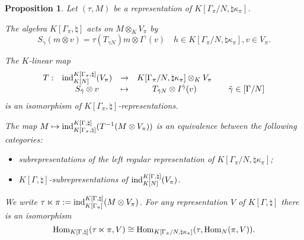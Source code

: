\documentclass[11pt]{amsart}
\newtheorem{prop}[thm]{Proposition}
\theoremstyle{definition}
\newcommand{\enuma}[1]{\begin{enumerate}[\textup{(}a\textup{)}] {#1} \end{enumerate}}
\def\Hom{{\rm Hom}}
\def\ind{{\rm ind}}
\begin{document}
\begin{prop}\label{prop:1.1}
Let $(\tau,M)$ be a representation of $K[\Gamma_\pi / N,\natural \kappa_\pi]$.
\enuma{
\item The algebra $K[\Gamma_\pi,\natural]$ acts on $M \otimes_K V_\pi$ by
\[
S_\gamma (m \otimes v) = \tau (T_{\gamma N}) m \otimes I^\gamma (v) 
\quad h \in K[\Gamma_\pi / N,\natural \kappa_\pi], v \in V_\pi .
\]
\item The $K$-linear map 
\[
\begin{array}{lcccl}
T : & \ind_{K [N]}^{K[\Gamma_\pi,\natural]} (V_\pi) & \to & 
K[\Gamma_\pi / N,\natural \kappa_\pi] \otimes_K V_\pi & \\
& S_{\tilde \gamma} \otimes v & \mapsto & T_{\tilde \gamma N} 
\otimes I^{\tilde \gamma} (v) & \quad \tilde \gamma \in [\Gamma / N] 
\end{array} 
\]
is an isomorphism of $K[\Gamma_\pi,\natural]$-representations.
\item The map $M \mapsto \ind_{K[\Gamma_\pi,\natural]}^{K[\Gamma,\natural]}
(T^{-1} (M \otimes V_\pi))$ is an equivalence between the following categories:
\begin{itemize}
\item subrepresentations of the left regular representation of 
$K[\Gamma_\pi / N,\natural \kappa_\pi]$;
\item $K[\Gamma,\natural]$-subrepresentations of
$\ind_{K [N]}^{K[\Gamma,\natural]} (V_\pi)$. 
\end{itemize}
\item We write $\tau \ltimes \pi := 
\ind_{K [\Gamma_\pi]}^{K[\Gamma,\natural]} (M \otimes V_\pi)$.
For any representation $V$ of $K[\Gamma,\natural]$ there is an isomorphism
\[
\Hom_{K[\Gamma,\natural]}(\tau \ltimes \pi,V) \cong 
\Hom_{K[\Gamma_\pi / N, \natural \kappa_\pi]}(\tau, \Hom_N (\pi,V)) .
\]
}
\end{prop}
\end{document}
